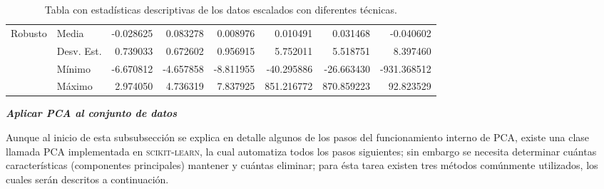 \begin{landscape}
\begin{table}[p!]
\begin{tabular}{ll|r|r|r|r|r|r|}
\multicolumn{1}{|l|}{\multirow{4}{*}{Robusto}} & Media & -0.028625 & 0.083278 & 0.008976 & 0.010491 & 0.031468 & -0.040602 \\ \cline{2-8} 
\multicolumn{1}{|l|}{}                  & Desv. Est. & 0.739033 & 0.672602 & 0.956915 & 5.752011 & 5.518751 & 8.397460 \\\cline{2-8} 
\multicolumn{1}{|l|}{}                  & M\'{i}nimo & -6.670812 & -4.657858	& -8.811955 & -40.295886 & -26.663430 & -931.368512 \\ \cline{2-8} 
\multicolumn{1}{|l|}{}                  & M\'{a}ximo & 2.974050 & 4.736319 & 7.837925 & 851.216772 & 870.859223 & 92.823529 \\ \hline
\end{tabular}
\caption{Tabla con estad\'{i}sticas descriptivas de los datos escalados con diferentes t\'{e}cnicas.}
\label{table:scalers}
\end{table}
\end{landscape}


\pagestyle{thesis}

\vspace{5mm} %

\textbf{\textit{Aplicar PCA al conjunto de datos}}

\vspace{5mm} %

Aunque al inicio de esta subsubsecci\'{o}n se explica en detalle algunos de los pasos del funcionamiento interno de PCA, existe una clase llamada PCA implementada en \textsc{scikit-learn}, la cual automatiza todos los pasos siguientes; sin embargo se necesita determinar cu\'{a}ntas caracter\'{i}sticas (componentes principales) mantener y cu\'{a}ntas eliminar; para \'{e}sta tarea existen tres m\'{e}todos com\'{u}nmente utilizados, los cuales ser\'{a}n descritos a continuaci\'{o}n.

